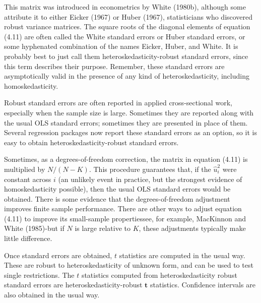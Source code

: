 \documentclass[10pt]{article}
\begin{document}
This matrix was introduced in econometrics by White (1980b), although some attribute it to either Eicker (1967) or Huber (1967), statisticians who discovered robust variance matrices. The square roots of the diagonal elements of equation (4.11) are often called the White standard errors or Huber standard errors, or some hyphenated combination of the names Eicker, Huber, and White. It is probably best to just call them heteroskedasticity-robust standard errors, since this term describes their purpose. Remember, these standard errors are asymptotically valid in the presence of any kind of heteroskedasticity, including homoskedasticity.

Robust standard errors are often reported in applied cross-sectional work, especially when the sample size is large. Sometimes they are reported along with the usual OLS standard errors; sometimes they are presented in place of them. Several regression packages now report these standard errors as an option, so it is easy to obtain heteroskedasticity-robust standard errors.

Sometimes, as a degrees-of-freedom correction, the matrix in equation (4.11) is multiplied by $N /(N-K)$. This procedure guarantees that, if the $\hat{u}_{i}^{2}$ were constant across $i$ (an unlikely event in practice, but the strongest evidence of homoskedasticity possible), then the usual OLS standard errors would be obtained. There is some evidence that the degrees-of-freedom adjustment improves finite sample performance. There are other ways to adjust equation (4.11) to improve its small-sample propertiessee, for example, MacKinnon and White (1985)-but if $N$ is large relative to $K$, these adjustments typically make little difference.

Once standard errors are obtained, $t$ statistics are computed in the usual way. These are robust to heteroskedasticity of unknown form, and can be used to test single restrictions. The $t$ statistics computed from heteroskedasticity robust standard errors are heteroskedasticity-robust $\boldsymbol{t}$ statistics. Confidence intervals are also obtained in the usual way.
\end{document}
